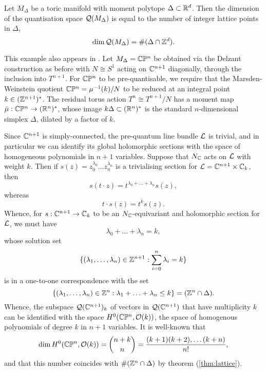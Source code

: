 \begin{prop}
	\label{thm:lattice}
	Let $M_{\Delta}$ be a toric manifold with moment polytope $\Delta \subset \mathbb{R}^{d}$. Then the dimension of the quantisation space $\mathcal{Q}(M_{\Delta})$ is equal to the number of integer lattice points in $\Delta$,
	\begin{equation*}
		\dim \mathcal{Q}(M_{\Delta}) = \#(\Delta \cap \mathbb{Z}^{d}).
	\end{equation*}
\end{prop}

\begin{ex}
	This example also appears in \cite{Ham08}. Let $M_{\Delta} = \mathbb{C}\mathbb{P}^{n}$ be obtained via the Delzant construction as before with $N \cong S^{1}$ acting on $\mathbb{C}^{n+1}$ diagonally, through the inclusion into $T^{n+1}$. For $\mathbb{C}\mathbb{P}^{n}$ to be pre-quantisable, we require that the Marsden-Weinstein quotient $\mathbb{C}\mathbb{P}^{n} = \mu^{-1}(k)/N$ to be reduced at an integral point $k \in (\mathbb{Z}^{n+1})^{\ast}$. The residual torus action $T^{n} \cong T^{n+1}/N$ has a moment map $\bar{\mu}:\mathbb{C}\mathbb{P}^{n} \rightarrow (\mathbb{R}^{n})^{\ast}$, whose image $k\Delta \subset (\mathbb{R}^{n})^{\ast}$ is the standard $n$-dimensional simplex $\Delta$, dilated by a factor of $k$.
	
	Since $\mathbb{C}^{n+1}$ is simply-connected, the pre-quantum line bundle $\mathcal{L}$ is trivial, and in particular we can identify its global holomorphic sections with the space of homogeneous polynomials in $n+1$ variables. Suppose that $N_{\mathbb{C}}$ acts on $\mathcal{L}$ with weight $k$. Then if $s(z) = z_{0}^{\lambda_{0}}\ldots z_{n}^{\lambda_{n}}$ is a trivialising section for $\mathcal{L} = \mathbb{C}^{n+1} \times \mathbb{C}_{k}$, then
	\begin{equation*}
		s(t\cdot z) = t^{\lambda_{0} + \ldots + \lambda_{n}}s(z),
	\end{equation*}
	whereas
	\begin{equation*}
		t\cdot s(z) = t^{k}s(z).
	\end{equation*}
	Whence, for $s:\mathbb{C}^{n+1} \rightarrow \mathbb{C}_{k}$ to be an $N_{\mathbb{C}}$-equivariant and holomorphic section for $\mathcal{L}$, we must have
	\begin{equation*}
		\lambda_{0} + \ldots + \lambda_{n} = k,
	\end{equation*}
	whose solution set
	$$
		\{(\lambda_{1},\ldots, \lambda_{n})\in \mathbb{Z}^{n+1} : \sum_{i=0}^{n}\lambda_{i} = k   \}
	$$
	is in a one-to-one correspondence with the set
	\begin{equation*}
		\{ (\lambda_{1}, \ldots,  \lambda_{n}) \in \mathbb{Z}^{n} : \lambda_{1} + \ldots + \lambda_{n} \leq k \} = (\mathbb{Z}^{n} \cap \Delta).
	\end{equation*}
	Whence, the subspace $\mathcal{Q}(\mathbb{C}^{n+1})_{k}$ of vectors in $\mathcal{Q}(\mathbb{C}^{n+1})$ that have multiplicity $k$ can be identified with the space $H^{0}(\mathbb{C}\mathbb{P}^{n},\mathcal{O}(k))$, \ie the space of homogenous polynomials of degree $k$ in $n+1$ variables. It is well-known that
	\begin{equation*}
		\dim H^{0}(\mathbb{C}\mathbb{P}^{n},\mathcal{O}(k)) = \binom{n + k}{n} = \frac{(k+1)(k+2),\ldots (k+n)}{n!},
	\end{equation*}
	and that this number coincides with $\#(\mathbb{Z}^{n} \cap \Delta)$ by theorem (\ref{thm:lattice}).
\end{ex}



